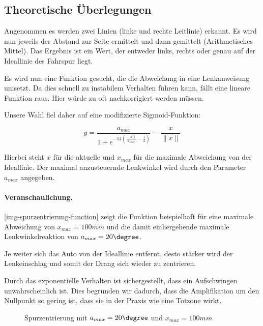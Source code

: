 \documentclass[a4paper,12pt]{report}
\begin{document}
\subsection{Theoretische Überlegungen}

	Angenommen es werden zwei Linien (linke und rechte Leitlinie) erkannt.
	Es wird nun jeweils der Abstand zur Seite ermittelt und dann gemittelt (Arithmetisches Mittel).
	Das Ergebnis ist ein Wert, der entweder links, rechts oder genau auf der Ideallinie des Fahrspur liegt.

	Es wird nun eine Funktion gesucht, die die Abweichung in eine Lenkanweisung umsetzt.
	Da dies schnell zu instabilem Verhalten führen kann, fällt eine lineare Funktion raus.
	Hier würde zu oft nachkorrigiert werden müssen.

	Unsere Wahl fiel daher auf eine modifizierte Sigmoid-Funktion:

		\[y=\frac{a_{max}}{1 + e^{-14\left( \frac{\left\|x\right\|}{x_{max}} - \frac{1}{2} \right)}} \cdot -\frac{x}{\left\|x\right\|}\]

	Hierbei steht $x$ für die aktuelle und $x_{max}$ für die maximale Abweichung von der Ideallinie.
	Der maximal anzusteuernde Lenkwinkel wird durch den Parameter $a_{max}$ angegeben.

	\paragraph{Veranschaulichung.} \autoref{img-spurzentrierung-function} zeigt die Funktion beispielhaft für eine maximale Abweichung von $x_{max} = 100mm$ und die damit einhergehende maximale Lenkwinkelreaktion von $a_{max} = 20\degree$.

	Je weiter sich das Auto von der Ideallinie entfernt, desto stärker wird der Lenkeinschlag und somit der Drang sich wieder zu zentrieren.

	Durch das exponentielle Verhalten ist sichergestellt, dass ein Aufschwingen unwahrscheinlich ist. Dies begründen wir dadurch, dass die Amplifikation um den Nullpunkt so gering ist, dass sie in der Praxis wie eine Totzone wirkt.

	\begin{figure}[ht]
		\centering


		\caption{Spurzentrierung mit $a_{max} = 20\degree$ und $x_{max} = 100mm$}
		\label{img-spurzentrierung-function}
	\end{figure}
\end{document}
